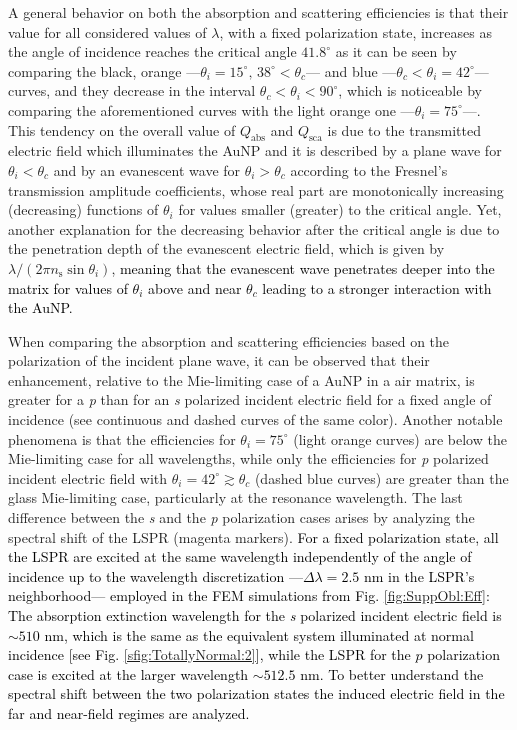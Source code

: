 A general behavior on both the absorption and scattering efficiencies is that their value for all considered values of $\lambda$, with a fixed polarization state, increases as the angle of incidence reaches the critical angle $41.8^\circ$ as it can be seen by comparing the black, orange ---$\theta_i = 15^\circ,\, 38^\circ < \theta_c$---  and blue ---$\theta_c<\theta_i = 42^\circ$--- curves, and they decrease in the interval  $\theta_c<\theta_i<90^\circ$, which is noticeable by comparing the aforementioned curves with the light orange one ---$\theta_i = 75^\circ$---. This tendency on the overall value of $Q_\text{abs}$ and $Q_\text{sca}$ is due to the transmitted electric field which illuminates the AuNP and it is described by a plane wave for $\theta_i<\theta_c$ and by an evanescent wave for $\theta_i>\theta_c$ according to the Fresnel's transmission amplitude coefficients, whose real part are monotonically increasing (decreasing) functions of $\theta_i$ for values smaller (greater) to the critical angle. Yet, another explanation for the decreasing behavior after the critical angle is due to the penetration depth of the evanescent electric field, which is given by $\lambda/(2\pi n_\text{s}\sin\theta_i)$, \textcolor{black}{meaning that the evanescent wave penetrates deeper into the matrix for values of $\theta_i$ above and near $\theta_c$ leading to a stronger interaction with the AuNP.}

When comparing the absorption and scattering efficiencies based on the polarization of the incident plane wave, it can be observed that their enhancement, relative to the Mie-limiting case of a AuNP in a air matrix, is greater for a  \textit{p} than for an \textit{s} polarized incident electric field for a fixed angle of incidence (see continuous and dashed curves of the same color). Another notable phenomena is that the  efficiencies for $\theta_i=75^\circ$ (light orange curves)  are below the Mie-limiting case for all wavelengths, while only the efficiencies for  \textit{p} polarized incident electric field with $\theta_i = 42^\circ \gtrsim \theta_c$ (dashed blue curves) are greater than the glass Mie-limiting case, particularly at the resonance wavelength. The last difference between the \textit{s} and the \textit{p} polarization cases arises by analyzing the spectral shift of the LSPR (magenta markers). \textcolor{black}{For a fixed polarization state, all the LSPR are excited at the same wavelength independently of the angle of incidence up to the wavelength discretization ---$\Delta \lambda = 2.5$ nm in the LSPR's neighborhood--- employed in the FEM simulations from Fig. \ref{fig:SuppObl:Eff}: The absorption extinction wavelength for the \textit{s} polarized incident electric field is $\sim 510$ nm, which is the same as the equivalent system illuminated at normal incidence [see Fig. \ref{sfig:TotallyNormal:2}], while the LSPR for the $p$ polarization case is excited at the larger wavelength $\sim 512.5$ nm. To better understand the spectral shift between the two polarization states the induced electric field in the far and near-field regimes are analyzed.}

